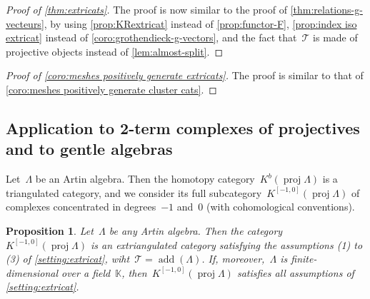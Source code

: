 \documentclass{amsart}
\newtheorem{proposition}[theorem]{Proposition}
\theoremstyle{definition}
\newcommand{\field}{\mathbb{K}}
\newcommand{\add}{\operatorname{add}}
\newcommand{\proj}{\operatorname{proj}}
\newcommand{\tc}{\mathcal{T}}
\begin{document}
\begin{proof}[Proof of \cref{thm:extricats}]
The proof is now similar to the proof of \cref{thm:relations-g-vecteurs}, by using \cref{prop:KRextricat} instead of \cref{prop:functor-F}, \cref{prop:index iso extricat} instead of \cref{coro:grothendieck-g-vectors}, and the fact that~$\tc$ is made of projective objects instead of \cref{lem:almost-split}.
\end{proof}

\begin{proof}[Proof of \cref{coro:meshes positively generate extricats}]
The proof is similar to that of \cref{coro:meshes positively generate cluster cats}.
\end{proof}


\subsection{Application to 2-term complexes of projectives and to gentle algebras}
\label{sec:Kbproj}

Let~$\Lambda$ be an Artin algebra.
Then the homotopy category~$K^b(\proj \Lambda)$ is a triangulated category, and we consider its full subcategory~$K^{[-1,0]}(\proj \Lambda)$ of complexes concentrated in degrees~$-1$ and~$0$ (with cohomological conventions).

\begin{proposition}
\label{prop:2kbproj-is-extriangulated}
Let~$\Lambda$ be any Artin algebra. Then the category~$K^{[-1,0]}(\proj \Lambda)$ is an extriangulated category satisfying the assumptions (1) to (3) of \cref{setting:extricat}, wiht~$\tc = \add(\Lambda)$. If, moreover,~$\Lambda$ is finite-dimensional over a field~$\field$, then~$K^{[-1,0]}(\proj \Lambda)$ satisfies all assumptions of \cref{setting:extricat}. 
\end{proposition}
\end{document}
